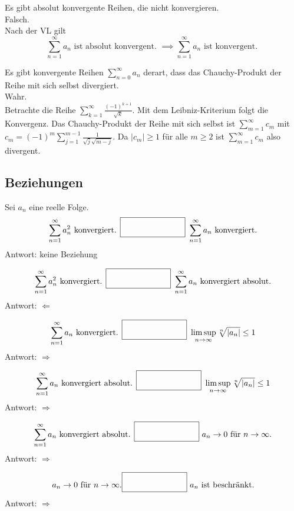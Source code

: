 Es gibt absolut konvergente Reihen, die nicht konvergieren.\\
Falsch.\\
Nach der VL gilt
\begin{displaymath}
  \sum_{n = 1}^{\infty} a_n \text{ ist absolut konvergent. } \implies \sum_{n = 1}^{\infty} a_n \text{ ist konvergent. }
\end{displaymath}

Es gibt konvergente Reihen $\sum_{n = 0}^{\infty} a_n$ derart, dass das Chauchy-Produkt der Reihe mit sich selbst divergiert.\\
Wahr.\\
Betrachte die Reihe $\sum_{k = 1}^{\infty} \frac{(-1)^{k+1}}{\sqrt{k}}$.
Mit dem Leibniz-Kriterium folgt die Konvergenz.
Das Chauchy-Produkt der Reihe mit sich selbst ist $\sum_{m = 1}^{\infty} c_m$ mit $c_m = (-1)^m \sum_{j = 1}^{m - 1} \frac{1}{\sqrt{j} \sqrt{m-j}}$.
Da $|c_m| \geq 1$ für alle $m \geq 2$ ist $\sum_{m = 1}^{\infty} c_m$ also divergent.

\subsection{Beziehungen}
Sei $a_n$ eine reelle Folge.
\begin{displaymath} 
  \sum_{n = 1}^{\infty} a_n^2 \text{ konvergiert. } \fbox{\rule{1in}{0pt}\rule[-0.5ex]{0pt}{4ex}} \text{ } \sum_{n = 1}^{\infty} a_n \text{ konvergiert.}
\end{displaymath}
Antwort: keine Beziehung

\begin{displaymath}
  \sum_{n = 1}^{\infty} a_n^2 \text{ konvergiert. } \fbox{\rule{1in}{0pt}\rule[-0.5ex]{0pt}{4ex}} \text{ } \sum_{n = 1}^{\infty} a_n \text{ konvergiert absolut.}
\end{displaymath}
Antwort: $\Leftarrow$

\begin{displaymath}
  \sum_{n = 1}^{\infty} a_n \text{ konvergiert. } \fbox{\rule{1in}{0pt}\rule[-0.5ex]{0pt}{4ex}} \text{ } \limsup_{n \to \infty} \sqrt[n]{|a_n|} \leq 1
\end{displaymath}
Antwort: $\Rightarrow$

\begin{displaymath}
  \sum_{n = 1}^{\infty} a_n \text{ konvergiert absolut. } \fbox{\rule{1in}{0pt}\rule[-0.5ex]{0pt}{4ex}} \text{ } \limsup_{n \to \infty} \sqrt[n]{|a_n|} \leq 1
\end{displaymath}
Antwort: $\Rightarrow$

\begin{displaymath}
  \sum_{n = 1}^{\infty} a_n \text{ konvergiert absolut. } \fbox{\rule{1in}{0pt}\rule[-0.5ex]{0pt}{4ex}} \text{ } a_n \to 0 \text{ für } n \to \infty \text{.}
\end{displaymath}
Antwort: $\Rightarrow$

\begin{displaymath}
  a_n \to 0 \text{ für } n \to \infty \text{.} \fbox{\rule{1in}{0pt}\rule[-0.5ex]{0pt}{4ex}} \text{ } a_n \text{ ist beschränkt.}
\end{displaymath}
Antwort: $\Rightarrow$